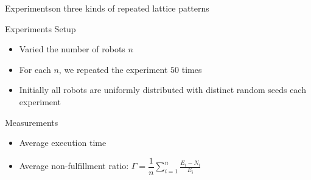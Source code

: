 \documentclass[10pt]{beamer}
\begin{document}
\begin{frame}{Experiments}{on three kinds of repeated
lattice patterns}
  \begin{block}{Experiments Setup}
    \begin{itemize}
    \item Varied the number of robots $n$
    \item For each $n$, we repeated the experiment $50$ times
    \item Initially all robots are uniformly distributed with distinct
      random seeds each experiment
    \end{itemize}
  \end{block}
  \begin{block}{Measurements}
    \begin{itemize}
    \item Average execution time
    \item Average non-fulfillment ratio: $\Gamma =
      \dfrac{1}{n}\sum\limits_{i=1}^n \frac{E_i - N_i}{E_i}$
    \end{itemize}
  \end{block}
\end{frame}
\end{document}
